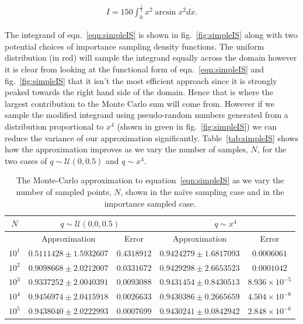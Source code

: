 	\begin{align}
		I = 150\int_{0}^{\frac{1}{2}}x^2\arcsin x^2dx.
		\label{eqn:simpleIS}
	\end{align}

	The integrand of eqn.~\eqref{eqn:simpleIS} is shown in fig.~\eqref{fig:simpleIS} along with two potential choices of importance sampling density functions.
	The uniform distribution (in red) will sample the integrand equally across the domain however it is clear from looking
	at the functional form of eqn.~\eqref{eqn:simpleIS} and fig.~\eqref{fig:simpleIS} that it isn't the most efficient approach since it is strongly peaked towards the
	right hand side of the domain.  Hence that is where the largest contribution to the Monte Carlo sum will come from.  However if we sample
	the modified integrand using pseudo-random numbers generated from a distribution proportional to $x^4$ (shown in green in fig.~\eqref{fig:simpleIS})
	we can reduce the variance of our approximation significantly.  Table~\eqref{tab:simpleIS} shows how the approximation improves as we vary
	the number of samples, $N$, for the two cases of $q\sim\mathcal{U}(0,0.5)$ and $q\sim x^4$.

	\begin{table}[hbt]
		\begin{center}
		\begin{tabular}{c | c | c | c | c}
		$N$       & \multicolumn{2}{c|}{$q\sim\mathcal{U}(0.0,0.5)$} & \multicolumn{2}{c}{$q\sim x^4$} \\ \hline
		          & Approximation & Error       & Approximation & Error       \\ \hline
		$10^1$    & $0.5111428 \pm 1.5932607$ & $0.4318912$ & $0.9424279 \pm 1.6817093$ & $0.0006061$ \\
		$10^2$    & $0.9098668 \pm 2.0212007$ & $0.0331672$ & $0.9429298 \pm 2.6653523$ & $0.0001042$ \\
		$10^3$    & $0.9337252 \pm 2.0040391$ & $0.0093088$ & $0.9431454 \pm 0.8430513$ & $8.936\times10^{-5}$ \\
		$10^4$    & $0.9456974 \pm 2.0415918$ & $0.0026633$ & $0.9430386 \pm 0.2665659$ & $4.504\times10^{-6}$ \\
		$10^5$    & $0.9438040 \pm 2.0222993$ & $0.0007699$ & $0.9430241 \pm 0.0842942$ & $2.848\times10^{-6}$ \\
		\end{tabular}
		\caption{The Monte-Carlo approximation to equation~\eqref{eqn:simpleIS} as we vary the number of sampled points, $N$, shown in
		the na\"ive sampling case and in the importance sampled case.}
		\label{tab:simpleIS}
		\end{center}
	\end{table}

